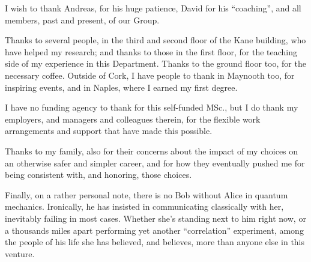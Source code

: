 I wish to thank Andreas, for his huge patience, David for
his ``coaching'',
and all members, past and present, of our Group.

Thanks to several people, in the third and second floor of the Kane building,
who have helped my research; and thanks to those in the first floor,
for the teaching side of my experience in this Department.
Thanks to the ground floor too, for the necessary coffee.
Outside of Cork, I have people to thank in Maynooth too,
for inspiring events,
and in Naples,
where I earned my first degree.

I have no funding agency to thank for this self-funded MSc.,
but I do thank my employers, and managers and colleagues therein,
for the flexible work arrangements and support that have made this possible.

Thanks to my family, also for their concerns about the impact of my choices on an otherwise safer and simpler career,
and for how they eventually pushed me for being consistent with, and honoring, those choices.

Finally, on a rather personal note, there is no Bob without Alice in quantum mechanics.
Ironically, he has insisted in communicating classically with her,
inevitably failing in most cases.
Whether she's standing next to him right now,
or a thousands miles apart performing yet another ``correlation'' experiment,
among the people of his life
she has believed, and believes, more than anyone else in this venture.
